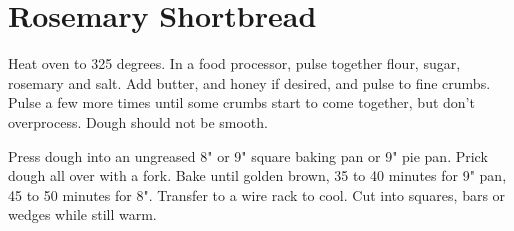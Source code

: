 \section{Rosemary Shortbread}
\begin{recipe}



	Heat oven to 325 degrees. In a food processor, pulse together flour, sugar, rosemary and salt. Add butter, and honey if desired, and pulse to fine crumbs. Pulse a few more times until some crumbs start to come together, but don't overprocess. Dough should not be smooth.

	Press dough into an ungreased 8" or 9" square baking pan or 9" pie pan. Prick dough all over with a fork. Bake until golden brown, 35 to 40 minutes for 9" pan, 45 to 50 minutes for 8". Transfer to a wire rack to cool. Cut into squares, bars or wedges while still warm.
\end{recipe}

